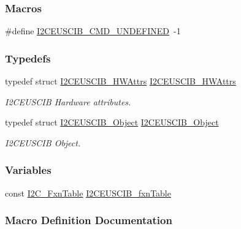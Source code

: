 \subsubsection*{Macros}
\begin{DoxyCompactItemize}
\item 
\#define \hyperlink{_i2_c_e_u_s_c_i_b_8h_a8c78b9f1f07217026467a46de151f1ba}{I2\-C\-E\-U\-S\-C\-I\-B\-\_\-\-C\-M\-D\-\_\-\-U\-N\-D\-E\-F\-I\-N\-E\-D}~-\/1
\end{DoxyCompactItemize}
\subsubsection*{Typedefs}
\begin{DoxyCompactItemize}
\item 
typedef struct \hyperlink{struct_i2_c_e_u_s_c_i_b___h_w_attrs}{I2\-C\-E\-U\-S\-C\-I\-B\-\_\-\-H\-W\-Attrs} \hyperlink{_i2_c_e_u_s_c_i_b_8h_ac186518a479ed39f3b2938dc44a72be5}{I2\-C\-E\-U\-S\-C\-I\-B\-\_\-\-H\-W\-Attrs}
\begin{DoxyCompactList}\small\item\em I2\-C\-E\-U\-S\-C\-I\-B Hardware attributes. \end{DoxyCompactList}\item 
typedef struct \hyperlink{struct_i2_c_e_u_s_c_i_b___object}{I2\-C\-E\-U\-S\-C\-I\-B\-\_\-\-Object} \hyperlink{_i2_c_e_u_s_c_i_b_8h_ae6882d1e8a8d4484a9a78d60f02fbe4c}{I2\-C\-E\-U\-S\-C\-I\-B\-\_\-\-Object}
\begin{DoxyCompactList}\small\item\em I2\-C\-E\-U\-S\-C\-I\-B Object. \end{DoxyCompactList}\end{DoxyCompactItemize}
\subsubsection*{Variables}
\begin{DoxyCompactItemize}
\item 
const \hyperlink{struct_i2_c___fxn_table}{I2\-C\-\_\-\-Fxn\-Table} \hyperlink{_i2_c_e_u_s_c_i_b_8h_aabe3af9e77a2b8cc7cd82dd22618e406}{I2\-C\-E\-U\-S\-C\-I\-B\-\_\-fxn\-Table}
\end{DoxyCompactItemize}


\subsubsection{Macro Definition Documentation}

